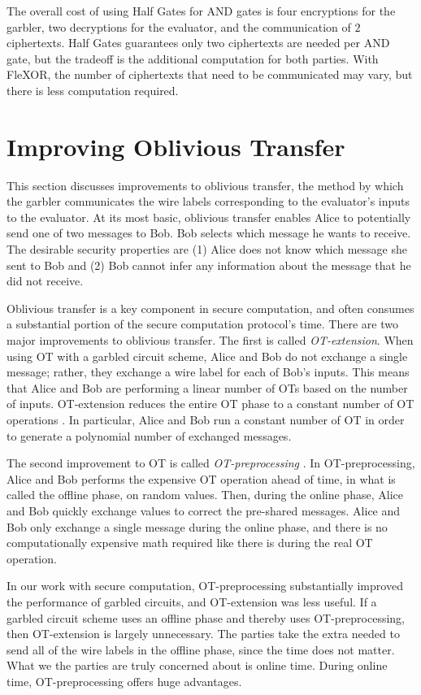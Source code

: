 The overall cost of using Half Gates for AND gates is four encryptions for the garbler, two decryptions for the evaluator, and the communication of $2$ ciphertexts. 
Half Gates guarantees only two ciphertexts are needed per AND gate, but the tradeoff is the additional computation for both parties.
With FleXOR, the number of ciphertexts that need to be communicated may vary, but there is less computation required.

\section{Improving Oblivious Transfer}
This section discusses improvements to oblivious transfer, the method by which the garbler communicates the wire labels corresponding to the evaluator's inputs to the evaluator.
At its most basic, oblivious transfer enables Alice to potentially send one of two messages to Bob.
Bob selects which message he wants to receive.
The desirable security properties are (1) Alice does not know which message she sent to Bob and (2) Bob cannot infer any information about the message that he did not receive.

Oblivious transfer is a key component in secure computation, and often consumes a substantial portion of the secure computation protocol's time.
There are two major improvements to oblivious transfer.
The first is called \textit{OT-extension}.
When using OT with a garbled circuit scheme, Alice and Bob do not exchange a single message; rather, they exchange a wire label for each of Bob's inputs.
This means that Alice and Bob are performing a linear number of OTs based on the number of inputs.
OT-extension reduces the entire OT phase to a constant number of OT operations \cite{otextension}.
In particular, Alice and Bob run a constant number of OT in order to generate a polynomial number of exchanged messages.

The second improvement to OT is called \textit{OT-preprocessing} \cite{Bea95}.
In OT-preprocessing, Alice and Bob performs the expensive OT operation ahead of time, in what is called the offline phase, on random values.
Then, during the online phase, Alice and Bob quickly exchange values to correct the pre-shared messages.
Alice and Bob only exchange a single message during the online phase, and there is no computationally expensive math required like there is during the real OT operation.

In our work with secure computation, OT-preprocessing substantially improved the performance of garbled circuits, and OT-extension was less useful.
If a garbled circuit scheme uses an offline phase and thereby uses OT-preprocessing, then OT-extension is largely unnecessary.
The parties take the extra needed to send all of the wire labels in the offline phase, since the time does not matter.
What we the parties are truly concerned about is online time.
During online time, OT-preprocessing offers huge advantages.

